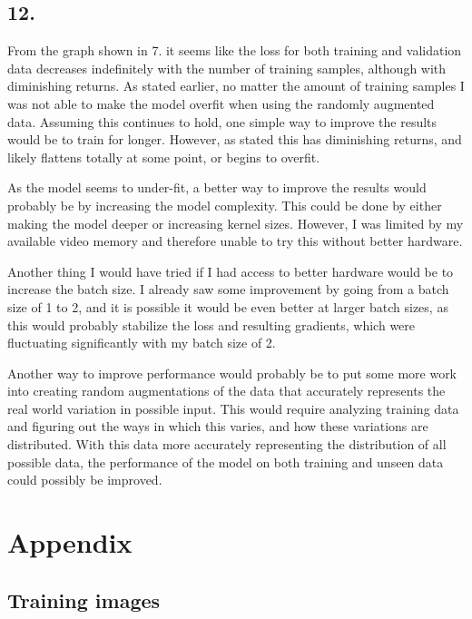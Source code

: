 \documentclass[a4paper, 12pt]{article}
\begin{document}
\subsection{12.}

From the graph shown in 7. it seems like the loss for both training and validation data decreases indefinitely with the number of training samples, although with diminishing returns. As stated earlier, no matter the amount of training samples I was not able to make the model overfit when using the randomly augmented data. Assuming this continues to hold, one simple way to improve the results would be to train for longer. However, as stated this has diminishing returns, and likely flattens totally at some point, or begins to overfit. 

As the model seems to under-fit, a better way to improve the results would probably be by increasing the model complexity. This could be done by either making the model deeper or increasing kernel sizes. However, I was limited by my available video memory and therefore unable to try this without better hardware.

Another thing I would have tried if I had access to better hardware would be to increase the batch size. I already saw some improvement by going from a batch size of 1 to 2, and it is possible it would be even better at larger batch sizes, as this would probably stabilize the loss and resulting gradients, which were fluctuating significantly with my batch size of 2.

Another way to improve performance would probably be to put some more work into creating random augmentations of the data that accurately represents the real world variation in possible input. This would require analyzing training data and figuring out the ways in which this varies, and how these variations are distributed. With this data more accurately representing the distribution of all possible data, the performance of the model on both training and unseen data could possibly be improved.

\appendix

\section{Appendix}

\subsection{Training images}
\end{document}
